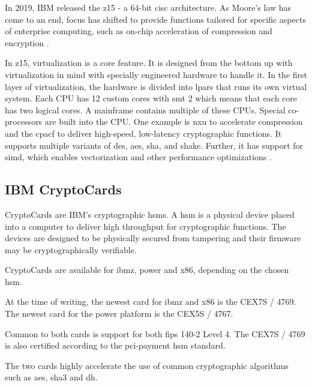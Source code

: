In 2019, IBM released the \gls{z15} \cite{jacobi2020} - a 64-bit \gls{cisc} architecture. As Moore's law has come to an end, focus has shifted to provide functions tailored for specific aspects of enterprise computing, such as on-chip acceleration of compression and encryption \cite{jacobi2020}.

In \gls{z15}, virtualization is a core feature. It is designed from the bottom up with virtualization in mind with specially engineered hardware to handle it. In the first layer of virtualization, the hardware is divided into \glspl{lpar} that runs its own virtual system. Each CPU has 12 custom cores with \gls{smt} 2 which means that each core has two logical cores. A mainframe contains multiple of these CPUs. Special co-processors are built into the CPU. One example is \gls{nxu} to accelerate compression and the \gls{cpacf} to deliver high-speed, low-latency cryptographic functions. It supports multiple variants of \gls{des}, \gls{aes}, \gls{sha}, and \gls{shake}. Further, it has support for \gls{simd}, which enables vectorization and other performance optimizations  \cite{redbook:z15}.


\subsection{IBM CryptoCards}

CryptoCards are IBM's cryptographic \glspl{hsm}. A \gls{hsm} is a physical device placed into a computer to deliver high throughput for cryptographic functions. The devices are designed to be physically secured from tampering and their firmware may be cryptographically verifiable\cite{ibm:hsms}.

CryptoCards are available for \gls{ibmz}, \gls{power} and \gls{x86}, depending on the chosen \gls{hsm}.

At the time of writing, the newest card for \gls{ibmz} and \gls{x86} is the CEX7S / 4769\cite{ibm:4769}. The newest card for the \gls{power} platform is the CEX5S / 4767\cite{ibm:4767}.

Common to both cards is support for both \gls{fips} 140-2 Level 4. The CEX7S / 4769 is also certified according to the \gls{pci-payment} \gls{hsm} standard\cite{ibm:4769,ibm:4767}.

The two cards highly accelerate the use of common cryptographic algorithms such as \gls{aes}, \gls{sha3} and \gls{dh}\cite{ibm:4767,ibm:4769}.